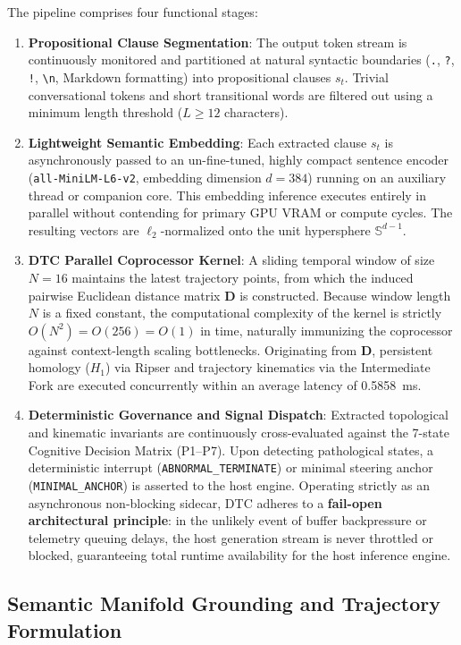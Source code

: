\documentclass[11pt,a4paper]{article}
\begin{document}
The pipeline comprises four functional stages:
\begin{enumerate}
    \item \textbf{Propositional Clause Segmentation}: The output token stream is continuously monitored and partitioned at natural syntactic boundaries (\texttt{.}, \texttt{?}, \texttt{!}, \texttt{\textbackslash n}, Markdown formatting) into propositional clauses $s_t$. Trivial conversational tokens and short transitional words are filtered out using a minimum length threshold ($L \ge 12$ characters).
    \item \textbf{Lightweight Semantic Embedding}: Each extracted clause $s_t$ is asynchronously passed to an un-fine-tuned, highly compact sentence encoder (\texttt{all-MiniLM-L6-v2}, embedding dimension $d=384$) running on an auxiliary thread or companion core. This embedding inference executes entirely in parallel without contending for primary GPU VRAM or compute cycles. The resulting vectors are $\ell_2$-normalized onto the unit hypersphere $\mathbb{S}^{d-1}$.
    \item \textbf{DTC Parallel Coprocessor Kernel}: A sliding temporal window of size $N=16$ maintains the latest trajectory points, from which the induced pairwise Euclidean distance matrix $\mathbf{D}$ is constructed. Because window length $N$ is a fixed constant, the computational complexity of the kernel is strictly $O(N^2) = O(256) = O(1)$ in time, naturally immunizing the coprocessor against context-length scaling bottlenecks. Originating from $\mathbf{D}$, persistent homology ($H_1$) via Ripser \cite{bauer2021ripser} and trajectory kinematics via the Intermediate Fork are executed concurrently within an average latency of 0.5858~ms.
    \item \textbf{Deterministic Governance and Signal Dispatch}: Extracted topological and kinematic invariants are continuously cross-evaluated against the 7-state Cognitive Decision Matrix (P1--P7). Upon detecting pathological states, a deterministic interrupt (\texttt{ABNORMAL\_TERMINATE}) or minimal steering anchor (\texttt{MINIMAL\_ANCHOR}) is asserted to the host engine. Operating strictly as an asynchronous non-blocking sidecar, DTC adheres to a \textbf{fail-open architectural principle}: in the unlikely event of buffer backpressure or telemetry queuing delays, the host generation stream is never throttled or blocked, guaranteeing total runtime availability for the host inference engine.
\end{enumerate}

\subsection{Semantic Manifold Grounding and Trajectory Formulation}
\end{document}
